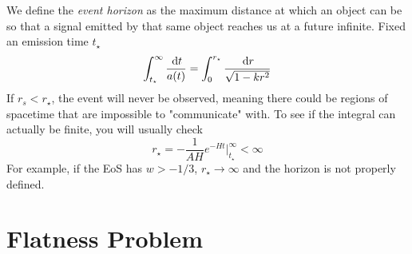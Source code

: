 We define the \emph{event horizon} as the maximum distance at which an object can be so that a signal emitted by that same object reaches us at a future infinite. Fixed an emission time $t_{\star}$
\begin{equation}
    \int_{t_{\star}}^{\infty}\frac{\,\text{d}t}{a(t)} = \int_{0}^{r_{\star}}\frac{\,\text{d}r}{\sqrt{1-kr^{2}}}
\end{equation}
If $r_{s} < r_{\star}$, the event will never be observed, meaning there could be regions of spacetime that are impossible to "communicate" with. To see if the integral can actually be finite, you will usually check 
\begin{equation}
    r_{\star} = -\frac{1}{AH}e^{-Ht}\Big|^{\infty}_{t_{\star}} < \infty
\end{equation} 
For example, if the EoS has $w>-1/3$, $r_{\star}\to \infty$ and the horizon is not properly defined.

\section{Flatness Problem}


